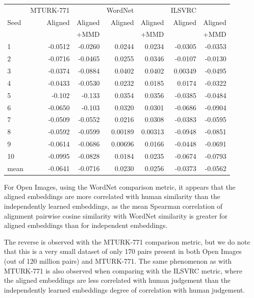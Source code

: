 \begin{table}[H]
\begin{tabular}{lrrrrrr}
  \toprule
       &   MTURK-771 &           &  WordNet  &           &  ILSVRC  &            \\
{Seed} &   Aligned   &  Aligned  &   Aligned &  Aligned  &  Aligned &  Aligned   \\
{}     &             & +MMD      &            & +MMD     &          &   +MMD     \\
\midrule
1    &     -0.0512 &    -0.0260  &   0.0244 &     0.0234 &    -0.0305 &    -0.0353   \\
2    &     -0.0716 &    -0.0465  &   0.0255 &     0.0346 &    -0.0107 &    -0.0130   \\
3    &     -0.0374 &    -0.0884  &   0.0402 &     0.0402 &     0.00349 &    -0.0495   \\
4    &     -0.0433 &    -0.0530  &   0.0232 &     0.0185 &     0.0174 &    -0.0322   \\
5    &     -0.102  &    -0.133   &   0.0354 &     0.0356 &    -0.0385 &    -0.0484   \\
6    &     -0.0650 &    -0.103   &   0.0320 &     0.0301 &    -0.0686 &    -0.0904   \\
7    &     -0.0509 &    -0.0552  &   0.0216 &     0.0308 &    -0.0383 &    -0.0595   \\
8    &     -0.0592 &    -0.0599  &   0.00189 &    0.00313 &   -0.0948 &    -0.0851   \\
9    &     -0.0614 &    -0.0686  &   0.00696 &    0.0166 &    -0.0448 &    -0.0691   \\
10   &     -0.0995 &    -0.0828  &   0.0184 &     0.0235 &    -0.0674 &    -0.0793   \\
\midrule                                                                                          
mean &     -0.0641 &    -0.0716  &   0.0230 &     0.0256 &    -0.0373 &    -0.0562   \\
\bottomrule
\end{tabular}
\end{table}


For Open Images, using the WordNet comparison metric, it appears that the aligned embeddings are more correlated with human similarity than the independently learned embeddings, as the mean Spearman correlation of alignment pairwise cosine similarity with WordNet similarity is greater for aligned embeddings than for independent embeddings. 

The reverse is observed with the MTURK-771 comparison metric, but we do note that this is a very small dataset of only 170 pairs present in both Open Images (out of 120 million pairs) and MTURK-771. The same phenomenon as with MTURK-771 is also observed when comparing with the ILSVRC metric, where the aligned embeddings are less correlated with human judgement than the independently learned embeddings degree of correlation with human judgement. 

